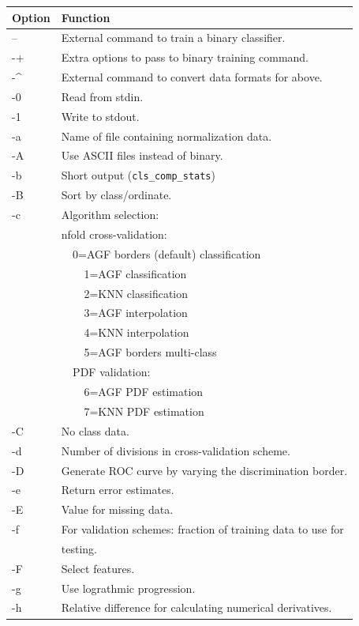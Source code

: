 \documentclass[12pt]{article}
\begin{document}
\begin{tabular}{ll}
Option & Function \\
\hline
-- & External command to train a binary classifier.\\
-+ & Extra options to pass to binary training command.\\
-\^ & External command to convert data formats for above.\\
-0 & Read from stdin.\\
-1 & Write to stdout.\\
-a & Name of file containing normalization data.\\
-A & Use ASCII files instead of binary.\\
-b & Short output (\verb/cls_comp_stats/)\\
-B & Sort by class/ordinate.\\
-c & Algorithm selection:\\
& nfold cross-validation:\\
& \verb/  /0=AGF borders (default) classification\\
& \verb/    /1=AGF classification\\
& \verb/    /2=KNN classification\\
& \verb/    /3=AGF interpolation\\
& \verb/    /4=KNN interpolation\\
& \verb/    /5=AGF borders multi-class\\
& \verb/  /PDF validation:\\
& \verb/    /6=AGF PDF estimation\\
& \verb/    /7=KNN PDF estimation\\
-C & No class data.\\
-d & Number of divisions in cross-validation scheme.\\
-D & Generate ROC curve by varying the discrimination border.\\
-e & Return error estimates.\\
-E & Value for missing data.\\
-f & For validation schemes:  fraction of training data to use for \\
   & testing.\\
-F & Select features.\\
-g & Use lograthmic progression. \\
-h & Relative difference for calculating numerical derivatives.
\end{tabular}
\end{document}
